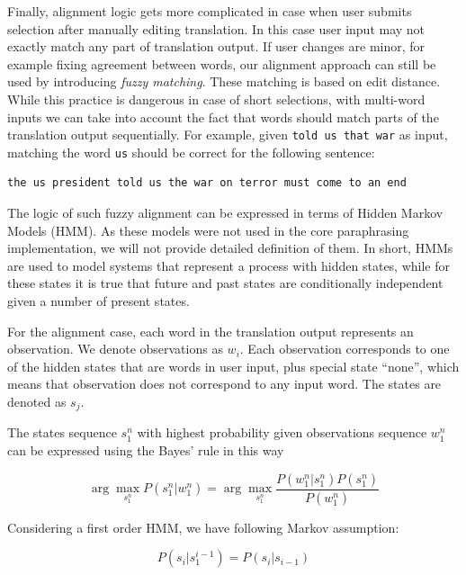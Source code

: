 Finally, alignment logic gets more complicated in case when user submits selection after manually editing translation. In this case user input may not exactly match any part of translation output. If user changes are minor, for example fixing agreement between words, our alignment approach can still be used by introducing \emph{fuzzy matching}. These matching is based on edit distance. While this practice is dangerous in case of short selections, with multi-word inputs we can take into account the fact that words should match parts of the translation output sequentially. For example, given \texttt{told us that war} as input, matching the word \texttt{us} should be correct for the following sentence: 

\begin{verbatim}
the us president told us the war on terror must come to an end
\end{verbatim}

The logic of such fuzzy alignment can be expressed in terms of Hidden Markov Models (HMM). As these models were not used in the core paraphrasing implementation, we will not provide detailed definition of them. In short, HMMs are used to model systems that represent a process with hidden states, while for these states it is true that future and past states are conditionally independent given a number of present states.

For the alignment case, each word in the translation output represents an observation. We denote observations as $w_{i}$. Each observation corresponds to one of the hidden states that are words in user input, plus special state ``none'', which means that observation does not correspond to any input word. The states are denoted as $s_{j}$. 

\begin{center}
The states sequence $s_{1}^{n}$ with highest probability given observations sequence $w_{1}^{n}$ can be expressed using the Bayes' rule in this way 
\end{center}
\begin{large}
\begin{equation}
\arg \max_{s_{1}^{n}} P(s_{1}^{n}|w_{1}^{n}) = \arg \max_{s_{1}^{n}} \frac{P(w_{1}^{n}|s_{1}^{n})P(s_{1}^{n})}{P(w_{1}^{n})}
\end{equation}
\end{large}

\begin{center}
Considering a first order HMM, we have following Markov assumption:
\end{center}
\begin{large}
\begin{equation}
P(s_{i}|s_{1}^{i-1}) = P(s_{i}|s_{i-1})
\end{equation}
\end{large}

